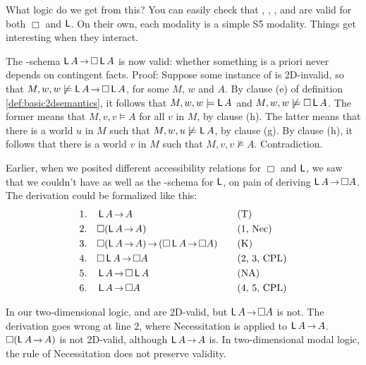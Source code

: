 What logic do we get from this?
You can easily check that , , , and  are valid for both $\Box$ and $\operatorname{\mathsf{L}}$.
On their own,
each modality is a simple S5 modality.
Things get interesting when they interact.

The -schema $\apriori A \to \Box \apriori A$ is now valid:
whether something is a priori never depends on contingent facts.
Proof:
Suppose some instance of  is 2D-invalid,
so that $M,w,w \not\models \apriori A \to \Box \apriori A$,
for some $M$, $w$ and $A$.
By clause (e) of definition \ref{def:basic2dsemantics},
it follows that $M,w,w \models \apriori A$ and $M,w,w \not\models \Box \apriori A$.
The former means that
$M,v,v \models A$ for all $v$ in $M$,
by clause (h).
The latter means that
there is a world $u$ in $M$ such that $M,w,u \not\models \apriori A$,
by clause (g).
By clause (h),
it follows that there is a world $v$ in $M$ such that $M,v,v \not\models A$.
Contradiction.

Earlier,
when we posited different accessibility relations for $\Box$ and $\operatorname{\mathsf{L}}$,
we saw that we couldn't have  as well as the -schema for $\operatorname{\mathsf{L}}$,
on pain of deriving $\apriori A \to \Box A$.
The derivation could be formalized like this:
%
\begin{alignat*}{2}
  1.\quad& \apriori A \to A &\quad& \text{(T)}\\
  2.\quad& \Box(\apriori A \to A) &\quad& \text{(1, Nec)}\\
  3.\quad& \Box(\apriori A \to A) \to (\Box \apriori A \to \Box A) &\quad& \text{(K)}\\
  4.\quad& \Box \apriori A \to \Box A &\quad& \text{(2, 3, CPL)}\\
  5.\quad& \apriori A \to \Box \apriori A &\quad& \text{(NA)}\\
  6.\quad& \apriori A \to \Box A &\quad& \text{(4, 5, CPL)}
\end{alignat*}

In our two-dimensional logic,
 and  are 2D-valid, 
but $\apriori A \to \Box A$ is not.
The derivation goes wrong at line 2, where Necessitation is applied to $\apriori A \to A$.
$\Box(\apriori A \to A)$ is not 2D-valid,
although $\apriori A \to A$ is.
In two-dimensional modal logic,
the rule of Necessitation does not preserve validity.


